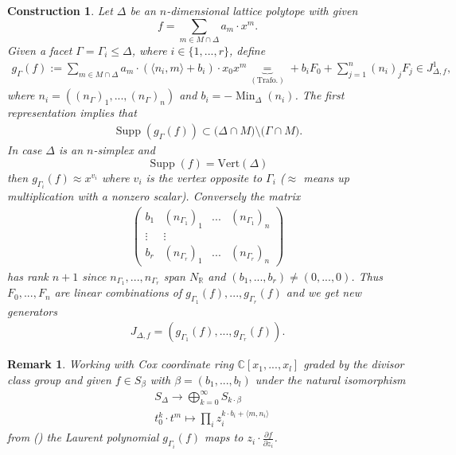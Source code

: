 \documentclass[12pt, english]{article}
\newtheorem{remark}[definition]{Remark}
\newtheorem{construction}[definition]{Construction}
\DeclareMathOperator{\Min}{Min}
\DeclareMathOperator{\Supp}{Supp}
\begin{document}
\begin{construction} \label{construction_of_R_Delta_Int_2}
	\normalfont	
	Let $\Delta$ be an $n$-dimensional lattice polytope with given 
	\[  f = \sum\limits_{m \in M \cap \Delta} a_m \cdot x^m. \]
	Given a facet $\Gamma = \Gamma_i \leq \Delta$, where $i \in \{1,...,r\}$, define
	\begin{align*}
		g_{\Gamma}(f) := \sum\limits_{m \in M \cap \Delta} a_m \cdot (\langle n_{i}, m \rangle + b_{i}) \cdot x_0 x^m  \underbrace{=}_{(\textrm{Trafo.})} + b_{i} F_0 + \sum\limits_{j = 1}^n (n_{i})_j F_j \in J_{\Delta,f}^1,
	\end{align*}
	where $n_{i} = ((n_{\Gamma})_1,..., (n_{\Gamma})_n)$ and $b_i = -\Min_{\Delta}(n_i)$. The first representation implies that
	\begin{align*}
		\Supp(g_{\Gamma}(f)) \subset \big( \Delta \cap M \big) \setminus \big( \Gamma \cap M \big).
	\end{align*}
	In case $\Delta$ is an $n$-simplex and
	\[ \Supp(f) = \textrm{Vert}(\Delta)  \]
	then $g_{\Gamma_i}(f) \approx x^{v_i}$ where $v_i$ is the vertex opposite to $\Gamma_i$ ($\approx$ means up multiplication with a nonzero scalar). Conversely the matrix
	\begin{align} \label{matrix_full_rank}
		\begin{pmatrix}
			b_{1} & (n_{\Gamma_1})_1 & ... & (n_{\Gamma_1})_n \\
			\vdots & \vdots \\
			b_{r} & (n_{\Gamma_r})_1 & ... & (n_{\Gamma_r})_n
		\end{pmatrix}	
	\end{align}
	has rank $n+1$ since $n_{\Gamma_1},...,n_{\Gamma_r}$ span $N_{\mathbb{R}}$ and $(b_{1},...,b_{r}) \neq (0,...,0)$. Thus $F_0,...,F_n$ are linear combinations of $g_{\Gamma_1}(f),...,g_{\Gamma_r}(f)$ and we get new generators
	\begin{align} \label{formula_new_generators_Jac_ideal}
		J_{\Delta,f} = (g_{\Gamma_1}(f),...,g_{\Gamma_r}(f)).
	\end{align} 
\end{construction}	

\begin{remark}
	\normalfont
	Working with \textit{Cox coordinate ring} $\mathbb{C}[x_1,...,x_l]$ graded by the divisor class group and given $f \in S_{\beta}$ with $\beta = (b_1,...,b_l)$ under the natural isomorphism
	\begin{align*}
		& S_{\Delta} \rightarrow \bigoplus_{k=0}^{\infty} S_{k \cdot \beta} \\
		& t_0^k \cdot t^m \mapsto \prod\limits_{i} z_i^{k \cdot b_i + \langle m,n_i \rangle}
	\end{align*}
	from (\cite{BatCo94}) the Laurent polynomial $g_{\Gamma_i}(f)$ maps to $z_i \cdot \frac{\partial f}{\partial z_i}$.
\end{remark}
\end{document}
